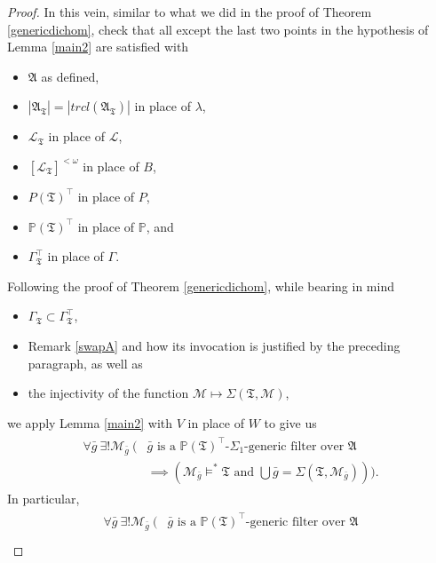 \documentclass[12pt, twoside]{memoir}
\numberwithin{equation}{section}
\theoremstyle{definition}
\theoremstyle{remark}
\theoremstyle{definition}
\theoremstyle{definition}
\theoremstyle{definition}
\theoremstyle{remark}
\begin{document}
\begin{proof}
In this vein, similar to what we did in the proof of Theorem \ref{genericdichom}, check that all except the last two points in the hypothesis of Lemma \ref{main2} are satisfied with 
\begin{itemize}
    \item $\mathfrak{A}$ as defined,
    \item $|\mathfrak{A}_{\mathfrak{T}}| = |trcl(\mathfrak{A}_{\mathfrak{T}})|$ in place of $\lambda$,
    \item $\mathcal{L}_{\mathfrak{T}}$ in place of $\mathcal{L}$,
    \item $[\mathcal{L}_{\mathfrak{T}}]^{< \omega}$ in place of $B$,
    \item $P(\mathfrak{T})^{\top}$ in place of $P$,
    \item $\mathbb{P}(\mathfrak{T})^{\top}$ in place of $\mathbb{P}$, and
    \item $\Gamma_{\mathfrak{T}}^{\top}$ in place of $\Gamma$.
\end{itemize} 
Following the proof of Theorem \ref{genericdichom}, while bearing in mind
\begin{itemize}
    \item $\Gamma_{\mathfrak{T}} \subset \Gamma_{\mathfrak{T}}^{\top}$,
    \item Remark \ref{swapA} and how its invocation is justified by the preceding paragraph, as well as
    \item the injectivity of the function $\mathcal{M} \mapsto \Sigma(\mathfrak{T}, \mathcal{M})$, 
\end{itemize}
we apply Lemma \ref{main2} with $V$ in place of $W$ to give us 
\begin{align}\label{marker0}
\begin{split}
    \forall \bar{g} \ \exists ! \mathcal{M}_{\bar{g}} \ ( & \bar{g} \text{ is a } \mathbb{P}(\mathfrak{T})^{\top} \text{-} \Sigma_1 \text{-generic filter over } \mathfrak{A} \\ 
    & \implies (\mathcal{M}_{\bar{g}} \models^* \mathfrak{T} \text{ and } \bigcup \bar{g} = \Sigma(\mathfrak{T}, \mathcal{M}_{\bar{g}}))) \text{.}
\end{split}
\end{align}
In particular,
\begin{align}\label{marker}
\begin{split}
    \forall \bar{g} \ \exists ! \mathcal{M}_{\bar{g}} \ ( & \bar{g} \text{ is a } \mathbb{P}(\mathfrak{T})^{\top} \text{-generic filter over } \mathfrak{A} \\ 

\end{split}
\end{align}
\end{proof}
\end{document}
